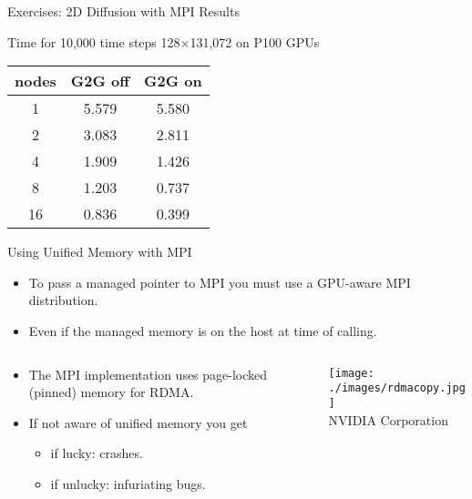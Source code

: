 \documentclass[aspectratio=43]{beamer}
\begin{document}
\begin{frame}[fragile]{Exercises: 2D Diffusion with MPI Results}
    \begin{info}{Time for 10,000 time steps \@ 128$\times$131,072 on P100 GPUs}
       \begin{center}
           \begin{tabular}{ccc}
               \hline
               nodes   &   G2G off & G2G on \\
                \hline
               1       &  5.579    &  5.580 \\
               2       &  3.083    &  2.811 \\
               4       &  1.909    &  1.426 \\
               8       &  1.203    &  0.737 \\
              16       &  0.836    &  0.399 \\
           \end{tabular}
       \end{center}
   \end{info}
\end{frame}

\begin{frame}[fragile]{Using Unified Memory with MPI}
    \begin{itemize}
        \item To pass a managed pointer to MPI you must use a GPU-aware MPI distribution.
        \item Even if the managed memory is on the host at time of calling.
    \end{itemize}

    \begin{columns}[T]
        \begin{column}{0.5\textwidth}
            \begin{itemize}
                \item The MPI implementation uses page-locked (pinned) memory for RDMA.
                \item If not aware of unified memory you get
                \begin{itemize}
                    \item if lucky: crashes.
                    \item if unlucky: infuriating bugs.
                \end{itemize}
            \end{itemize}
        \end{column}

        \begin{column}{0.5\textwidth}
            \texttt{[image: ./images/rdmacopy.jpg]}\\
            \footnotesize \textcopyright NVIDIA Corporation
        \end{column}
    \end{columns}
\end{frame}
\end{document}
